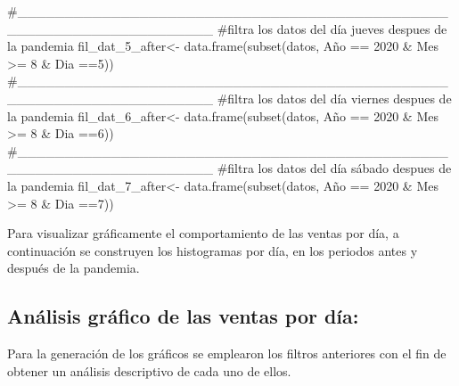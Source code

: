 \documentclass[
  us-letterpaper,
]{scrreprt}
\newenvironment{Shaded}{\begin{snugshade}}{\end{snugshade}}
\newcommand{\CommentTok}[1]{\textcolor[rgb]{0.37,0.37,0.37}{#1}}
\newcommand{\DecValTok}[1]{\textcolor[rgb]{0.68,0.00,0.00}{#1}}
\newcommand{\FunctionTok}[1]{\textcolor[rgb]{0.28,0.35,0.67}{#1}}
\newcommand{\NormalTok}[1]{\textcolor[rgb]{0.00,0.23,0.31}{#1}}
\newcommand{\OtherTok}[1]{\textcolor[rgb]{0.00,0.23,0.31}{#1}}
\newcommand{\SpecialCharTok}[1]{\textcolor[rgb]{0.37,0.37,0.37}{#1}}
\theoremstyle{plain}
\theoremstyle{plain}
\theoremstyle{definition}
\theoremstyle{remark}
\begin{document}
\begin{Shaded}
\begin{Highlighting}[]
\CommentTok{\#\_\_\_\_\_\_\_\_\_\_\_\_\_\_\_\_\_\_\_\_\_\_\_\_\_\_\_\_\_\_\_\_\_\_\_\_\_\_\_\_\_\_\_\_\_\_\_\_\_\_\_\_\_\_\_\_\_\_\_\_\_\_\_\_\_\_\_\_}
\CommentTok{\#filtra los datos del día jueves despues de la pandemia}
\NormalTok{fil\_dat\_5\_after}\OtherTok{\textless{}{-}} \FunctionTok{data.frame}\NormalTok{(}\FunctionTok{subset}\NormalTok{(datos,}
\NormalTok{                                    Año }\SpecialCharTok{==} \DecValTok{2020} \SpecialCharTok{\&}\NormalTok{ Mes }\SpecialCharTok{\textgreater{}=} \DecValTok{8} \SpecialCharTok{\&}\NormalTok{ Dia }\SpecialCharTok{==}\DecValTok{5}\NormalTok{))}
\CommentTok{\#\_\_\_\_\_\_\_\_\_\_\_\_\_\_\_\_\_\_\_\_\_\_\_\_\_\_\_\_\_\_\_\_\_\_\_\_\_\_\_\_\_\_\_\_\_\_\_\_\_\_\_\_\_\_\_\_\_\_\_\_\_\_\_\_\_\_\_\_}
\CommentTok{\#filtra los datos del día viernes despues de la pandemia}
\NormalTok{fil\_dat\_6\_after}\OtherTok{\textless{}{-}} \FunctionTok{data.frame}\NormalTok{(}\FunctionTok{subset}\NormalTok{(datos,}
\NormalTok{                                    Año }\SpecialCharTok{==} \DecValTok{2020} \SpecialCharTok{\&}\NormalTok{ Mes }\SpecialCharTok{\textgreater{}=} \DecValTok{8} \SpecialCharTok{\&}\NormalTok{ Dia }\SpecialCharTok{==}\DecValTok{6}\NormalTok{))}
\CommentTok{\#\_\_\_\_\_\_\_\_\_\_\_\_\_\_\_\_\_\_\_\_\_\_\_\_\_\_\_\_\_\_\_\_\_\_\_\_\_\_\_\_\_\_\_\_\_\_\_\_\_\_\_\_\_\_\_\_\_\_\_\_\_\_\_\_\_\_\_\_}
\CommentTok{\#filtra los datos del día sábado despues de la pandemia}
\NormalTok{fil\_dat\_7\_after}\OtherTok{\textless{}{-}} \FunctionTok{data.frame}\NormalTok{(}\FunctionTok{subset}\NormalTok{(datos,}
\NormalTok{                                    Año }\SpecialCharTok{==} \DecValTok{2020} \SpecialCharTok{\&}\NormalTok{ Mes }\SpecialCharTok{\textgreater{}=} \DecValTok{8} \SpecialCharTok{\&}\NormalTok{ Dia }\SpecialCharTok{==}\DecValTok{7}\NormalTok{))}
\end{Highlighting}
\end{Shaded}

Para visualizar gráficamente el comportamiento de las ventas por día, a
continuación se construyen los histogramas por día, en los periodos
antes y después de la pandemia.

\subsection{Análisis gráfico de las ventas por
día:}\label{anuxe1lisis-gruxe1fico-de-las-ventas-por-duxeda}

Para la generación de los gráficos se emplearon los filtros anteriores
con el fin de obtener un análisis descriptivo de cada uno de ellos.
\end{document}
